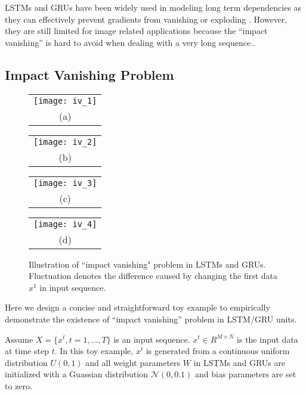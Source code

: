 \documentclass[10pt,twocolumn,letterpaper]{article}
\begin{document}
LSTMs and GRUs have been widely used in modeling long term dependencies as they can effectively prevent gradients from vanishing or exploding \cite{32}. However, they are still limited for image related applications because the ``impact vanishing'' is hard to avoid when dealing with a very long sequence.. 

\subsection{Impact Vanishing Problem}



\begin{figure}
  \centering
  \begin{tabular}[b]{c}
    \texttt{[image: iv\_1]} \\
    \small (a)
  \end{tabular} \qquad
  \begin{tabular}[b]{c}
    \texttt{[image: iv\_2]} \\
    \small (b)
  \end{tabular} \qquad
      \begin{tabular}[b]{c}
    \texttt{[image: iv\_3]} \\
    \small (c)
  \end{tabular} \qquad
    \begin{tabular}[b]{c}
    \texttt{[image: iv\_4]} \\
    \small (d)
  \end{tabular}
  
  
  \caption{Illustration of ``impact vanishing" problem in LSTMs and GRUs. Fluctuation denotes the difference caused by changing the first data $x^1$ in input sequence.}
  \label{fig:iv}
\end{figure}






Here we design a concise and straightforward toy example to empirically demonstrate the existence of ``impact vanishing'' problem in LSTM/GRU units.


Assume $X=\{x^{t}, t=1,...,T\}$ is an input sequence. $x^t  \in R^{M \times N}$ is the input data at time step $t$. In this toy example,  $x^t$ is generated from a continuous uniform distribution $ U (0,1)$ and all weight parameters $W$ in LSTMs and GRUs are initialized with a Guassian distribution $\mathcal{N}(0,0.1)$ and bias parameters are set to zero. 
\end{document}
